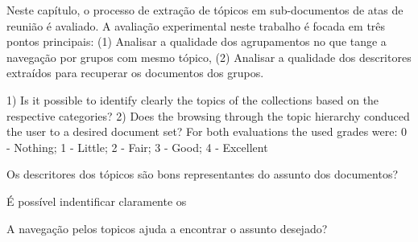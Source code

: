 Neste capítulo, o processo de extração de tópicos em sub-documentos de atas de reunião é avaliado. A avaliação experimental neste trabalho é focada em três pontos principais: 
(1) Analisar a qualidade dos agrupamentos no que tange a navegação por grupos com mesmo tópico, 
(2) Analisar a qualidade dos descritores extraídos para recuperar os documentos dos grupos.





1) Is it possible to identify clearly the topics of the collections
based on the respective categories?
2) Does the browsing through the topic hierarchy conduced
the user to a desired document set?
For both evaluations the used grades were:
0 - Nothing;
1 - Little;
2 - Fair;
3 - Good;
4 - Excellent


\item Os descritores dos tópicos são bons representantes do assunto dos documentos?
\item É possível indentificar claramente os 
\item A navegação pelos topicos ajuda a encontrar o assunto desejado?







%

%


